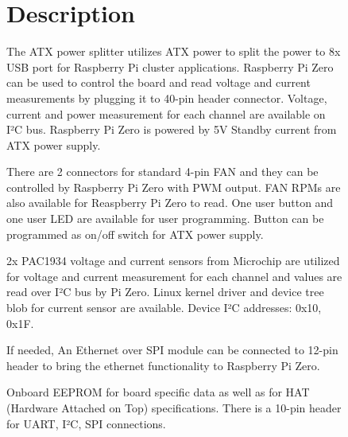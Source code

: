 \documentclass[a4paper,14pt,oneside,pdflatex,english,final,twocolumn]{article}
\begin{document}
\begin{figure}[ht]
	\begin{minipage}{1\textwidth}
		\section{Description}
		\par
		The ATX power splitter utilizes ATX power to split the power to 8x USB port for Raspberry Pi cluster applications. Raspberry Pi Zero can be used to control the board and read voltage and current measurements by plugging it to 40-pin header connector. Voltage, current and power measurement for each channel are available on I²C bus. Raspberry Pi Zero is powered by 5V Standby current from ATX power supply. 
		\par There are 2 connectors for standard 4-pin FAN and they can be controlled by Raspberry Pi Zero with PWM output. FAN RPMs are also available for Reaspberry Pi Zero to read. One user button and one user LED are available for user programming. Button can be programmed as on/off switch for ATX power supply. 
		\par
		2x PAC1934 voltage and current sensors from Microchip are utilized for voltage and current measurement for each channel and values are read over I²C bus by Pi Zero. Linux kernel driver and device tree blob for current sensor are available. Device I²C addresses: 0x10, 0x1F.
		\par
		If needed, An Ethernet over SPI module can be connected to 12-pin header to bring the ethernet functionality to Raspberry Pi Zero.
		\par 
		Onboard EEPROM for board specific data as well as for HAT (Hardware Attached on Top) specifications.
		There is a 10-pin header for UART, I²C, SPI connections.
	\end{minipage}


\end{figure}
\end{document}
